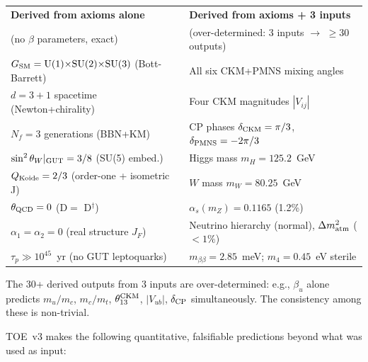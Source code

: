 \documentclass[12pt]{article}
\theoremstyle{definition}
\theoremstyle{remark}
\begin{document}
\begin{center}
\begin{tabular}{p{6cm}p{8cm}}
\toprule
\textbf{Derived from axioms alone} & \textbf{Derived from axioms + 3 inputs} \\
(no $\beta$ parameters, exact) & (over-determined: 3 inputs $\to$ $\geq$30 outputs) \\
\midrule
$G_{\rm SM}=\mathrm{U}(1){\times}\mathrm{SU}(2){\times}\mathrm{SU}(3)$ (Bott-Barrett) &
  All six CKM+PMNS mixing angles \\
$d=3{+}1$ spacetime (Newton+chirality) &
  Four CKM magnitudes $|V_{ij}|$ \\
$N_f=3$ generations (BBN+KM) &
  CP phases $\delta_{\rm CKM}=\pi/3$, $\delta_{\rm PMNS}=-2\pi/3$ \\
$\sin^2\theta_W|_{\rm GUT}=3/8$ (SU(5) embed.) &
  Higgs mass $m_H=125.2$~GeV \\
$Q_{\rm Koide}=2/3$ (order-one + isometric J) &
  $W$ mass $m_W=80.25$~GeV \\
$\theta_{\rm QCD}=0$ (D$=$ D$^\dag$) &
  $\alpha_s(m_Z)=0.1165$ (1.2\%) \\
$\alpha_1=\alpha_2=0$ (real structure $J_F$) &
  Neutrino hierarchy (normal), $\Delta m^2_{\rm atm}$ ($<1\%$) \\
$\tau_p\gg 10^{45}$~yr (no GUT leptoquarks) &
  $m_{\beta\beta}=2.85$~meV; $m_4=0.45$~eV sterile \\
\bottomrule
\end{tabular}
\end{center}

The 30+ derived outputs from 3 inputs are over-determined: e.g., $\beta_u$ alone
predicts $m_u/m_c$, $m_c/m_t$, $\theta_{13}^{\rm CKM}$, $|V_{ub}|$, $\delta_{\rm CP}$
simultaneously.  The consistency among these is non-trivial.

TOE~v3 makes the following quantitative, falsifiable predictions beyond what
was used as input:
\end{document}
